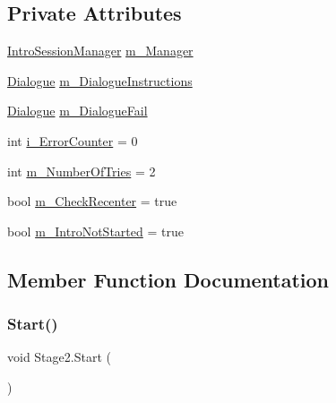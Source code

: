 \subsection*{Private Attributes}
\begin{DoxyCompactItemize}
\item 
\mbox{\hyperlink{class_intro_session_manager}{Intro\+Session\+Manager}} \mbox{\hyperlink{class_stage2_ac0c7fd7470c7a7119e6990c794d4b6da}{m\+\_\+\+Manager}}
\item 
\mbox{\hyperlink{class_dialogue}{Dialogue}} \mbox{\hyperlink{class_stage2_a568227038f1502ead76a3063cb56e7ad}{m\+\_\+\+Dialogue\+Instructions}}
\item 
\mbox{\hyperlink{class_dialogue}{Dialogue}} \mbox{\hyperlink{class_stage2_a1976a81381663da59cdb6e16d2c303e4}{m\+\_\+\+Dialogue\+Fail}}
\item 
int \mbox{\hyperlink{class_stage2_a91dc2a2d19d9cecdf3faf0d63670570b}{i\+\_\+\+Error\+Counter}} = 0
\item 
int \mbox{\hyperlink{class_stage2_acfd2cec2899355884335066e879af778}{m\+\_\+\+Number\+Of\+Tries}} = 2
\item 
bool \mbox{\hyperlink{class_stage2_a7716d04bef0e8c283cdb51aa09d288da}{m\+\_\+\+Check\+Recenter}} = true
\item 
bool \mbox{\hyperlink{class_stage2_a1bf043d9a2be31a8be2000e3ac763a69}{m\+\_\+\+Intro\+Not\+Started}} = true
\end{DoxyCompactItemize}


\subsection{Member Function Documentation}
\mbox{\label{class_stage2_a6ef397aad3d634caf09da4dc09dfeffa}} 
\subsubsection{\texorpdfstring{Start()}{Start()}}
{\footnotesize\ttfamily void Stage2.\+Start (\begin{DoxyParamCaption}{ }\end{DoxyParamCaption})\hspace{0.3cm}{\ttfamily [private]}}

\mbox{\label{class_stage2_a50f93eb0e6e1ef6e71d85df9f951f189}} 
